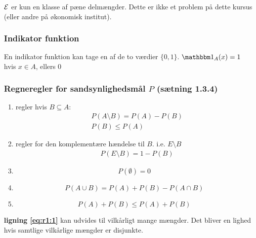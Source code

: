 $\mathcal{E}$ er kun en klasse af pæne delmængder. Dette er ikke et problem på dette kursus (eller andre på økonomisk institut).

\subsubsection{Indikator funktion}

En indikator funktion kan tage en af de to værdier $\{0,1\}$.
$\indic_{A}(x) = 1$ hvis $x\in A$, ellers $0$

\subsubsection{Regneregler for sandsynlighedsmål $P$ (sætning 1.3.4)}

\begin{enumerate}
    \item regler hvis $B \subseteq A$: \begin{align}
        &P(A \setminus B) = P(A) - P(B) \\
        &P(B) \leq P(A)
    \end{align}
    \item regler for den komplementære hændelse til $B$. i.e. $E\setminus B$ \begin{align}
        &P(E\setminus B) = 1 - P(B)
    \end{align}
    \item \begin{equation}
        P(\emptyset) = 0
    \end{equation}
    \item \begin{equation}
        P(A \cup B) = P(A) + P(B) - P(A\cap B)
    \end{equation}
    \item \begin{equation}\label{eq:r1:1}
        P(A) + P(B) \leq P(A) + P(B)
    \end{equation}
\end{enumerate}

\textbf{ligning \ref{eq:r1:1}} kan udvides til vilkårligt mange mængder. Det bliver en lighed hvis samtlige vilkårlige mængder er disjunkte.

\horizline
